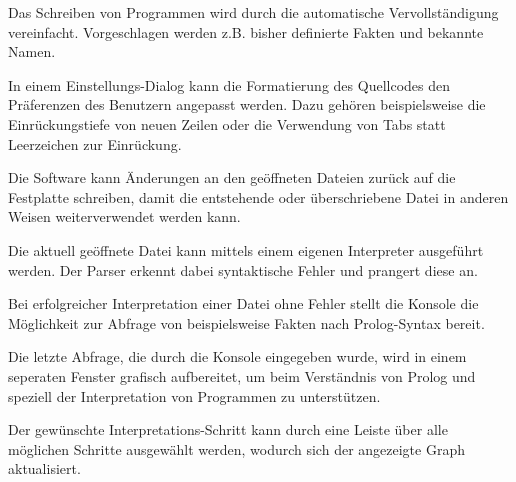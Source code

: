 \documentclass[parskip=full,11pt,twoside]{scrartcl}
\begin{document}

Das Schreiben von Programmen wird durch die automatische Vervollständigung vereinfacht. Vorgeschlagen werden z.B. bisher definierte Fakten und bekannte Namen.


In einem Einstellungs-Dialog kann die Formatierung des Quellcodes den Präferenzen des Benutzern angepasst werden. Dazu gehören beispielsweise die Einrückungstiefe von neuen Zeilen oder die Verwendung von Tabs statt Leerzeichen zur Einrückung.


Die Software kann Änderungen an den geöffneten Dateien zurück auf die Festplatte schreiben, damit die entstehende oder überschriebene Datei in anderen Weisen weiterverwendet werden kann.


Die aktuell geöffnete Datei kann mittels einem eigenen Interpreter ausgeführt werden. Der Parser erkennt dabei syntaktische Fehler und prangert diese an.


Bei erfolgreicher Interpretation einer Datei ohne Fehler stellt die Konsole die Möglichkeit zur Abfrage von beispielsweise Fakten nach Prolog-Syntax bereit.


Die letzte Abfrage, die durch die Konsole eingegeben wurde, wird in einem seperaten Fenster grafisch aufbereitet, um beim Verständnis von Prolog und speziell der Interpretation von Programmen zu unterstützen.


Der gewünschte Interpretations-Schritt kann durch eine Leiste über alle möglichen Schritte ausgewählt werden, wodurch sich der angezeigte Graph aktualisiert.
\end{document}
